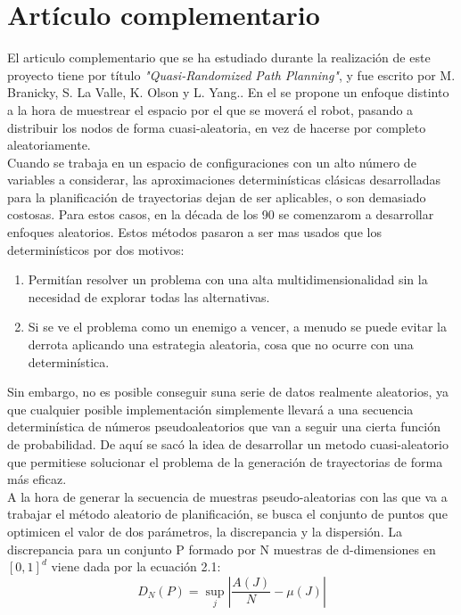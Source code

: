 \section{Artículo complementario}
\label{articulo_complementario}


El articulo complementario que se ha estudiado durante la realización de este proyecto tiene por título \textsl{"Quasi-Randomized Path Planning"}, y fue escrito por M. Branicky, S. La Valle, K. Olson y L. Yang.. En el se propone un enfoque distinto a la hora de muestrear el espacio por el que se moverá el robot, pasando a distribuir los nodos de forma cuasi-aleatoria, en vez de hacerse por completo aleatoriamente.
\\

Cuando se trabaja en un espacio de configuraciones con un alto número de variables a considerar, las aproximaciones determinísticas clásicas desarrolladas para la planificación de trayectorias dejan de ser aplicables, o son demasiado costosas. Para estos casos, en la década de los 90 se comenzarom a desarrollar enfoques aleatorios. Estos métodos pasaron a ser mas usados que los determinísticos por dos motivos:
\begin{enumerate}
\item Permitían resolver un problema con una alta multidimensionalidad sin la necesidad de explorar todas las alternativas.
\item Si se ve el problema como un enemigo a vencer, a menudo se puede evitar la derrota aplicando una estrategia aleatoria, cosa que no ocurre con una determinística. 
\end{enumerate}  

Sin embargo, no es posible conseguir suna serie de datos realmente aleatorios, ya que cualquier posible implementación simplemente llevará a una secuencia determinística de números pseudoaleatorios que van a seguir una cierta función de probabilidad. De aquí se sacó la idea de desarrollar un metodo cuasi-aleatorio que permitiese solucionar el problema de la generación de trayectorias de forma más eficaz. 
\\

A la hora de generar la secuencia de muestras pseudo-aleatorias con las que va a trabajar el método aleatorio de planificación, se busca el conjunto de puntos que optimicen el valor de dos parámetros, la discrepancia y la dispersión. La discrepancia para un conjunto P formado por N muestras de d-dimensiones en $[0,1]^{d}$  viene dada por la ecuación 2.1:
\begin{equation}
D_{N}(P) = \sup_{j} |\frac{A(J)}{N}-\mu(J)|
\end{equation} 

